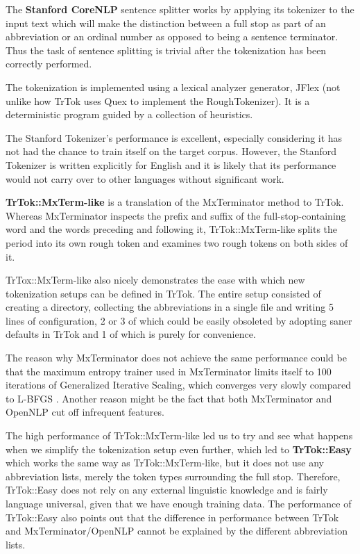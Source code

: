 The \textbf{Stanford CoreNLP} sentence splitter works by applying its
tokenizer to the input text which will make the distinction between a
full stop as part of an abbreviation or an ordinal number as opposed
to being a sentence terminator. Thus the task of sentence splitting is
trivial after the tokenization has been correctly performed.

The tokenization is implemented using a lexical analyzer generator,
JFlex (not unlike how TrTok uses Quex to implement the
RoughTokenizer). It is a deterministic program guided by a collection
of heuristics.

The Stanford Tokenizer's performance is excellent, especially
considering it has not had the chance to train itself on the target
corpus. However, the Stanford Tokenizer is written explicitly for
English and it is likely that its performance would not carry over to
other languages without significant work.

\textbf{TrTok::MxTerm-like} is a translation of the MxTerminator
method to TrTok. Whereas MxTerminator inspects the prefix and suffix
of the full-stop-containing word and the words preceding and
following it, TrTok::MxTerm-like splits the period into its own rough
token and examines two rough tokens on both sides of it.

TrTox::MxTerm-like also nicely demonstrates the ease with which new
tokenization setups can be defined in TrTok. The entire setup
consisted of creating a directory, collecting the abbreviations in a
single file and writing 5 lines of configuration, 2 or 3 of which
could be easily obsoleted by adopting saner defaults in TrTok and 1 of
which is purely for convenience.

The reason why MxTerminator does not achieve the same performance
could be that the maximum entropy trainer used in MxTerminator limits
itself to 100 iterations of Generalized Iterative Scaling, which
converges very slowly compared to L-BFGS \cite{maxent-algorithms}.
Another reason might be the fact that both MxTerminator and OpenNLP
cut off infrequent features.

The high performance of TrTok::MxTerm-like led us to try and see what
happens when we simplify the tokenization setup even further, which
led to \textbf{TrTok::Easy} which works the same way as
TrTok::MxTerm-like, but it does not use any abbreviation lists, merely
the token types surrounding the full stop. Therefore, TrTok::Easy does
not rely on any external linguistic knowledge and is fairly language
universal, given that we have enough training data. The performance of
TrTok::Easy also points out that the difference in performance between
TrTok and MxTerminator/OpenNLP cannot be explained by the different
abbreviation lists.

